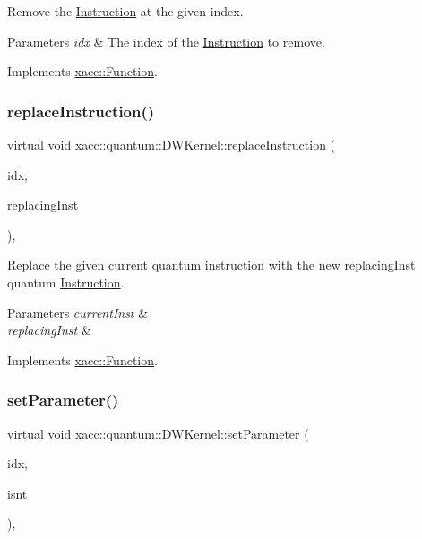 Remove the \hyperlink{a01657}{Instruction} at the given index.


\begin{DoxyParams}{Parameters}
{\em idx} & The index of the \hyperlink{a01657}{Instruction} to remove. \\
\hline
\end{DoxyParams}


Implements \hyperlink{a01653_ab6478b09bb28e194bb555b3180737733}{xacc\+::\+Function}.

\mbox{\label{a01221_a75eb3560d2f81c9a5ae1cf765deb0e83}} 
\subsubsection{\texorpdfstring{replace\+Instruction()}{replaceInstruction()}}
{\footnotesize\ttfamily virtual void xacc\+::quantum\+::\+D\+W\+Kernel\+::replace\+Instruction (\begin{DoxyParamCaption}\item[{const int}]{idx,  }\item[{Inst\+Ptr}]{replacing\+Inst }\end{DoxyParamCaption})\hspace{0.3cm}{\ttfamily [inline]}, {\ttfamily [virtual]}}

Replace the given current quantum instruction with the new replacing\+Inst quantum \hyperlink{a01657}{Instruction}.


\begin{DoxyParams}{Parameters}
{\em current\+Inst} & \\
\hline
{\em replacing\+Inst} & \\
\hline
\end{DoxyParams}


Implements \hyperlink{a01653_a2ef6a4923a6734f90f6ee3d94d263af0}{xacc\+::\+Function}.

\mbox{\label{a01221_adf89cdd1f54e183c4cff36b338b2be8d}} 
\subsubsection{\texorpdfstring{set\+Parameter()}{setParameter()}}
{\footnotesize\ttfamily virtual void xacc\+::quantum\+::\+D\+W\+Kernel\+::set\+Parameter (\begin{DoxyParamCaption}\item[{const int}]{idx,  }\item[{Instruction\+Parameter \&}]{isnt }\end{DoxyParamCaption})\hspace{0.3cm}{\ttfamily [inline]}, {\ttfamily [virtual]}}

